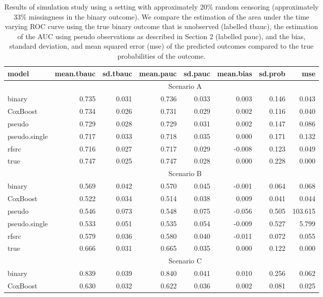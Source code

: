 \documentclass{statsoc}
\begin{document}
\begin{footnotesize}
\begin{table}
\caption{\label{sim1}Results of simulation study using a setting with approximately 20\% random censoring (approximately 33\% missingness in the binary outcome). We compare the estimation of the area under the time varying ROC curve using the true binary outcome that is unobserved (labelled tbauc), the estimation of the AUC using pseudo observations as described in Section 2 (labelled pauc), and the bias, standard deviation, and mean squared error (mse) of the predicted outcomes compared to the true probabilities of the outcome. }
\centering
\begin{tabular}{lrrrrrrr}
\hline
model & mean.tbauc & sd.tbauc & mean.pauc & sd.pauc & mean.bias & sd.prob & mse\\
\hline
& \multicolumn{7}{c}{Scenario A} \\
\hline
binary & 0.735 & 0.031 & 0.736 & 0.033 & 0.003 & 0.146 & 0.043\\
CoxBoost & 0.734 & 0.026 & 0.731 & 0.029 & 0.002 & 0.116 & 0.040\\
pseudo & 0.729 & 0.028 & 0.729 & 0.031 & 0.002 & 0.147 & 0.086\\
pseudo.single & 0.717 & 0.033 & 0.718 & 0.035 & 0.000 & 0.171 & 0.132\\
rfsrc & 0.716 & 0.027 & 0.717 & 0.029 & -0.008 & 0.123 & 0.049\\
true & 0.747 & 0.025 & 0.747 & 0.028 & 0.000 & 0.228 & 0.000\\
\hline
& \multicolumn{7}{c}{Scenario B} \\
\hline
binary & 0.569 & 0.042 & 0.570 & 0.045 & -0.001 & 0.064 & 0.068\\
CoxBoost & 0.522 & 0.034 & 0.514 & 0.038 & 0.009 & 0.041 & 0.044\\
pseudo & 0.546 & 0.073 & 0.548 & 0.075 & -0.056 & 0.505 & 103.615\\
pseudo.single & 0.533 & 0.051 & 0.535 & 0.054 & -0.009 & 0.527 & 5.799\\
rfsrc & 0.579 & 0.036 & 0.580 & 0.040 & -0.011 & 0.072 & 0.055\\
true & 0.666 & 0.031 & 0.665 & 0.035 & 0.000 & 0.122 & 0.000\\
\hline
& \multicolumn{7}{c}{Scenario C} \\
\hline
binary & 0.839 & 0.039 & 0.840 & 0.041 & 0.010 & 0.256 & 0.062\\
CoxBoost & 0.630 & 0.032 & 0.622 & 0.036 & 0.002 & 0.081 & 0.025\\

\end{tabular}
\end{table}
\end{footnotesize}
\end{document}
